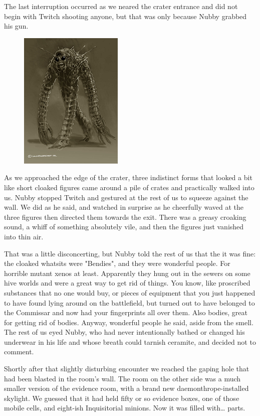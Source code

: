 The last interruption occurred as we neared the crater entrance and did not begin with Twitch shooting anyone, but that was only because Nubby grabbed his gun.

\begin{figure}
	\begin{center}
		\includegraphics[width=\figwidth]{pics/16/25.png}
	\end{center}
\end{figure}
As we approached the edge of the crater, three indistinct forms that looked a bit like short cloaked figures came around a pile of crates and practically walked into us. 
Nubby stopped Twitch and gestured at the rest of us to squeeze against the wall. 
We did as he said, and watched in surprise as he cheerfully waved at the three figures then directed them towards the exit. 
There was a greasy croaking sound, a whiff of something absolutely vile, and then the figures just vanished into thin air.

That was a little disconcerting, but Nubby told the rest of us that the it was fine: 
the cloaked whatsits were "Bendies", and they were wonderful people. 
For horrible mutant xenos at least. 
Apparently they hung out in the sewers on some hive worlds and were a great way to get rid of things. 
You know, like proscribed substances that no one would buy, or pieces of equipment that you just happened to have found lying around on the battlefield, but turned out to have belonged to the Commissar and now had your fingerprints all over them. 
Also bodies, great for getting rid of bodies. 
Anyway, wonderful people he said, aside from the smell. 
The rest of us eyed Nubby, who had never intentionally bathed or changed his underwear in his life and whose breath could tarnish ceramite, and decided not to comment.

Shortly after that slightly disturbing encounter we reached the gaping hole that had been blasted in the room's wall. 
The room on the other side was a much smaller version of the evidence room, with a brand new daemonthrope-installed skylight. 
We guessed that it had held fifty or so evidence boxes, one of those mobile cells, and eight-ish Inquisitorial minions. 
Now it was filled with… parts. 


